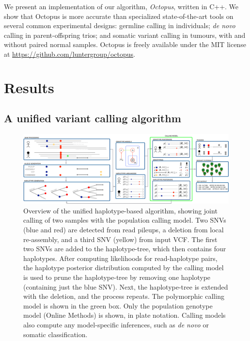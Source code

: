 \documentclass[notitlepage, twocolumn, 10pt]{article}
\begin{document}
We present an implementation of our algorithm, \emph{Octopus}, written in C++. We show that Octopus is more accurate than specialized state-of-the-art tools on several common experimental designs: germline calling in individuals; \textit{de novo} calling in parent-offspring trios; and somatic variant calling in tumours, with and without paired normal samples. Octopus 
is freely available under the MIT license at \url{https://github.com/luntergroup/octopus}.

\section*{Results}

\subsection*{A unified variant calling algorithm}

\begin{figure}[ht!]
    \includegraphics[width=\textwidth]{figures/method}
    \caption{Overview of the unified haplotype-based algorithm, showing joint calling of two samples with the population calling model. Two SNVs (blue and red) are detected from read pileups, a deletion from local re-assembly, and a third SNV (yellow) from input VCF. The first two SNVs are added to the haplotype-tree, which then contains four haplotypes. After computing likelihoods for read-haplotype pairs, the haplotype posterior distribution computed by the calling model is used to prune the haplotype-tree by removing one haplotype (containing just the blue SNV). Next, the haplotype-tree is extended with the deletion, and the process repeats. The polymorphic calling model is shown in the green box. 
    Only the population genotype model (Online Methods) is shown, in plate notation. Calling models also compute any model-specific inferences, such as \textit{de novo} or somatic classification.}
    \label{fig:method}
\end{figure}
\end{document}
